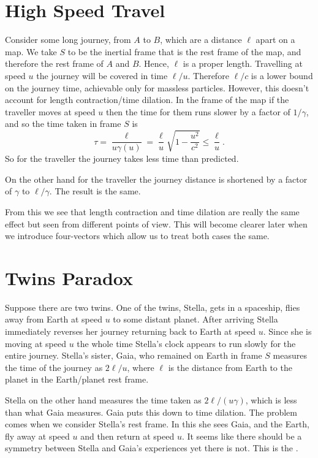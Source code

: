 \documentclass[fleqn]{NotesClass}
\begin{document}
    \section{High Speed Travel}
    Consider some long journey, from \(A\) to \(B\), which are a distance \(\ell\) apart on a map.
    We take \(S\) to be the inertial frame that is the rest frame of the map, and therefore the rest frame of \(A\) and \(B\).
    Hence, \(\ell\) is a proper length.
    Travelling at speed \(u\) the journey will be covered in time \(\ell/u\).
    Therefore \(\ell/c\) is a lower bound on the journey time, achievable only for massless particles.
    However, this doesn't account for length contraction/time dilation.
    In the frame of the map if the traveller moves at speed \(u\) then the time for them runs slower by a factor of \(1/\gamma\), and so the time taken in frame \(S\) is
    \begin{equation}
        \tau = \frac{\ell}{u \gamma(u)} = \frac{\ell}{u}\sqrt{1 - \frac{u^2}{c^2}} \le \frac{\ell}{u}.
    \end{equation}
    So for the traveller the journey takes less time than predicted.
    
    On the other hand for the traveller the journey distance is shortened by a factor of \(\gamma\) to \(\ell/\gamma\).
    The result is the same.
    
    From this we see that length contraction and time dilation are really the same effect but seen from different points of view.
    This will become clearer later when we introduce four-vectors which allow us to treat both cases the same.
    
    \section{Twins Paradox}\label{sec:twins paradox}
    Suppose there are two twins.
    One of the twins, Stella, gets in a spaceship, flies away from Earth at speed \(u\) to some distant planet.
    After arriving Stella immediately reverses her journey returning back to Earth at speed \(u\).
    Since she is moving at speed \(u\) the whole time Stella's clock appears to run slowly for the entire journey.
    Stella's sister, Gaia, who remained on Earth in frame \(S\) measures the time of the journey as \(2\ell/u\), where \(\ell\) is the distance from Earth to the planet in the Earth/planet rest frame.
    
    Stella on the other hand measures the time taken as \(2\ell/(u\gamma)\), which is less than what Gaia measures.
    Gaia puts this down to time dilation.
    The problem comes when we consider Stella's rest frame.
    In this she sees Gaia, and the Earth, fly away at speed \(u\) and then return at speed \(u\).
    It seems like there should be a symmetry between Stella and Gaia's experiences yet there is not.
    This is the .
    
\end{document}
